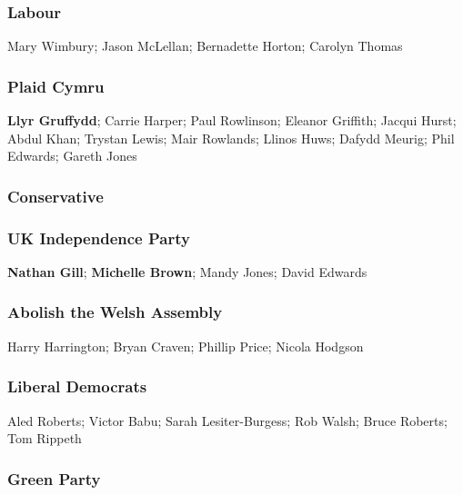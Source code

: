 \begin{resultsiii}
\subsubsection*{Labour}

Mary Wimbury; Jason McLellan; Bernadette Horton; Carolyn Thomas

\subsubsection*{Plaid Cymru}

\textbf{Llyr Gruffydd}; Carrie Harper; Paul Rowlinson; Eleanor Griffith; Jacqui Hurst; Abdul Khan; Trystan Lewis; Mair Rowlands; Llinos Huws; Dafydd Meurig; Phil Edwards; Gareth Jones

\subsubsection*{Conservative}


\subsubsection*{UK Independence Party}

\textbf{Nathan Gill}; \textbf{Michelle Brown}; Mandy Jones; David Edwards

\subsubsection*{Abolish the Welsh Assembly}

Harry Harrington; Bryan Craven; Phillip Price; Nicola Hodgson

\subsubsection*{Liberal Democrats}

Aled Roberts; Victor Babu; Sarah Lesiter-Burgess; Rob Walsh; Bruce Roberts; Tom Rippeth

\subsubsection*{Green Party}



\end{resultsiii}
